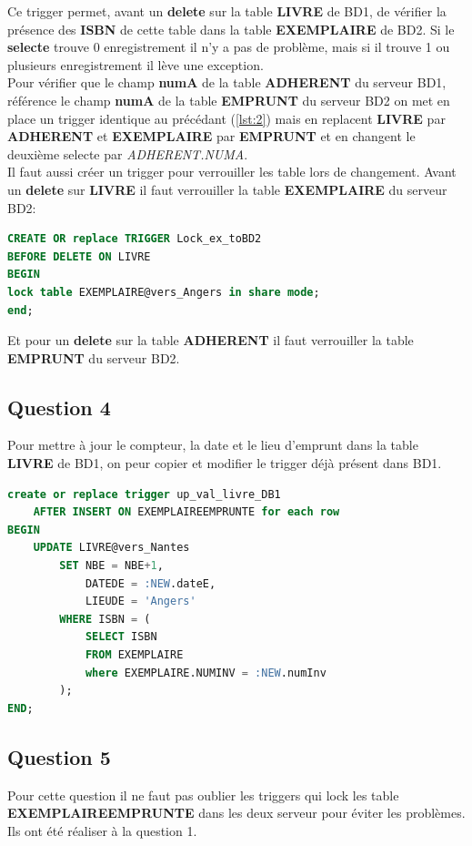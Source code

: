 \documentclass{article}
\begin{document}
Ce trigger permet, avant un \textbf{delete} sur la table \textbf{LIVRE} de BD1, de vérifier la présence des \textbf{ISBN} de cette table dans la table \textbf{EXEMPLAIRE} de BD2. Si le \textbf{selecte} %
trouve 0 enregistrement il n'y a pas de problème, mais si il trouve 1 ou plusieurs enregistrement il lève une exception. 
\\

Pour vérifier que le champ \textbf{numA} de la table \textbf{ADHERENT} du serveur BD1, référence le champ \textbf{numA} de la table \textbf{EMPRUNT} du serveur BD2 on met en place un trigger identique au précédant (\ref{lst:2}) mais en replacent \textbf{LIVRE} par \textbf{ADHERENT} et \textbf{EXEMPLAIRE} par \textbf{EMPRUNT} et en changent le deuxième selecte par \textit{ADHERENT.NUMA}.
\\

Il faut aussi créer un trigger pour verrouiller les table lors de changement.
Avant un \textbf{delete} sur \textbf{LIVRE} il faut verrouiller la table \textbf{EXEMPLAIRE} du serveur BD2:
\begin{lstlisting}[language=SQL, caption= Trigger]
CREATE OR replace TRIGGER Lock_ex_toBD2
BEFORE DELETE ON LIVRE
BEGIN
lock table EXEMPLAIRE@vers_Angers in share mode;
end;
\end{lstlisting}
Et pour un \textbf{delete} sur la table \textbf{ADHERENT} il faut verrouiller la table \textbf{EMPRUNT} du serveur BD2.


\subsection{Question 4}
Pour mettre à jour le compteur, la date et le lieu d'emprunt
dans la table \textbf{LIVRE} de BD1, on peur copier et modifier le trigger déjà présent dans BD1.
\begin{lstlisting}[language=SQL, caption= Trigger up\_val\_livre\_DB1]
create or replace trigger up_val_livre_DB1
    AFTER INSERT ON EXEMPLAIREEMPRUNTE for each row
BEGIN
    UPDATE LIVRE@vers_Nantes
        SET NBE = NBE+1,
            DATEDE = :NEW.dateE,
            LIEUDE = 'Angers'
        WHERE ISBN = (
            SELECT ISBN 
            FROM EXEMPLAIRE 
            where EXEMPLAIRE.NUMINV = :NEW.numInv 
        );
END;
\end{lstlisting}


\subsection{Question 5}
Pour cette question il ne faut pas oublier les triggers qui lock les table \textbf{EXEMPLAIREEMPRUNTE} dans les deux serveur pour éviter les problèmes.
Ils ont été réaliser à la question 1.
\\
\end{document}
